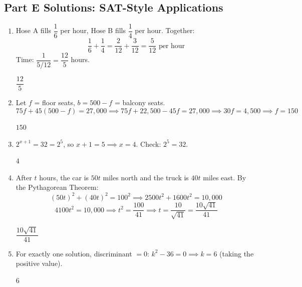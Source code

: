 \documentclass[14pt]{extarticle}
\begin{document}
\subsection*{Part E Solutions: SAT-Style Applications}
\begin{enumerate}
  \item Hose A fills \(\dfrac{1}{6}\) per hour, Hose B fills \(\dfrac{1}{4}\) per hour. Together:
  \[
  \frac{1}{6} + \frac{1}{4} = \frac{2}{12} + \frac{3}{12} = \frac{5}{12} \text{ per hour}
  \]
  Time: \(\dfrac{1}{5/12} = \dfrac{12}{5}\) hours.

  \(\boxed{\dfrac{12}{5}}\)

  \item Let \(f\) = floor seats, \(b = 500 - f\) = balcony seats.
  \[
  75f + 45(500 - f) = 27{,}000 \implies 75f + 22{,}500 - 45f = 27{,}000 \implies 30f = 4{,}500 \implies f = 150
  \]

  \(\boxed{150}\)

  \item \(2^{x+1} = 32 = 2^5\), so \(x + 1 = 5 \implies x = 4\). Check: \(2^5 = 32\).

  \(\boxed{4}\)

  \item After \(t\) hours, the car is \(50t\) miles north and the truck is \(40t\) miles east. By the Pythagorean Theorem:
  \[
  (50t)^2 + (40t)^2 = 100^2 \implies 2500t^2 + 1600t^2 = 10{,}000
  \]
  \[
  4100t^2 = 10{,}000 \implies t^2 = \frac{100}{41} \implies t = \frac{10}{\sqrt{41}} = \frac{10\sqrt{41}}{41}
  \]

  \(\boxed{\dfrac{10\sqrt{41}}{41}}\)

  \item For exactly one solution, discriminant \(= 0\): \(k^2 - 36 = 0 \implies k = 6\) (taking the positive value).

  \(\boxed{6}\)
\end{enumerate}

\end{document}
